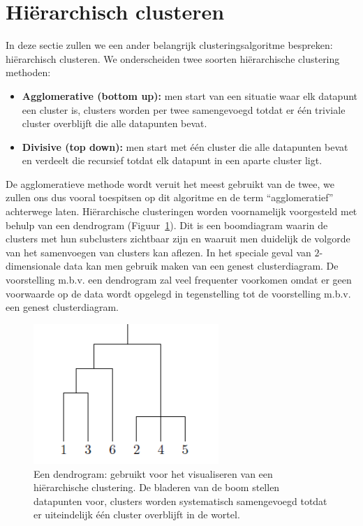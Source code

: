 \documentclass[a4paper,12pt]{article}
\theoremstyle{definition}
\begin{document}
\newpage
\section{Hiërarchisch clusteren}
\label{hierarch}
In deze sectie zullen we een ander belangrijk clusteringsalgoritme bespreken:
hiërarchisch clusteren. We onderscheiden twee soorten hiërarchische clustering methoden:
\begin{itemize}
 \item \textbf{Agglomerative (bottom up):} men start van een situatie waar elk
 datapunt een cluster is, clusters worden per twee samengevoegd totdat er één
 triviale cluster overblijft die alle datapunten bevat.
 \item \textbf{Divisive (top down):} men start met één cluster die alle datapunten
 bevat en verdeelt die recursief totdat elk datapunt in een aparte cluster ligt.
\end{itemize}

De agglomeratieve methode wordt veruit het meest gebruikt van de twee, we zullen
ons dus vooral toespitsen op dit algoritme en de term ``agglomeratief'' achterwege
laten. Hiërarchische clusteringen worden
voornamelijk voorgesteld met behulp van een dendrogram (Figuur~\ref{fig:dendrogram}). Dit is een boomdiagram
waarin de clusters met hun subclusters zichtbaar zijn en waaruit men duidelijk
de volgorde van het samenvoegen van clusters kan aflezen.
In het speciale geval van $2$-dimensionale data kan men gebruik maken van een
genest clusterdiagram. De voorstelling m.b.v. een dendrogram zal veel frequenter
voorkomen omdat er geen voorwaarde op de data wordt opgelegd in tegenstelling tot
de voorstelling m.b.v. een genest clusterdiagram.

 \begin{figure}[!ht]\centering
  \includegraphics[width=7cm]{dendrogram.png}
  \caption{Een dendrogram: gebruikt voor het visualiseren van een hiërarchische clustering.
   De bladeren van de boom stellen datapunten voor, clusters worden systematisch samengevoegd
   totdat er uiteindelijk één cluster overblijft in de wortel.}
  \label{fig:dendrogram}
 \end{figure}
 
\end{document}

